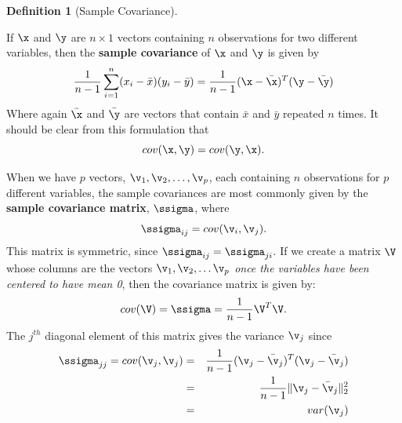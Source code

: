 \documentclass[
]{article}
\theoremstyle{definition}
\newtheorem{definition}{Definition}[section]
\theoremstyle{definition}
\theoremstyle{definition}
\theoremstyle{definition}
\theoremstyle{remark}
\begin{document}
\begin{definition}[Sample Covariance]
\protect\hypertarget{def:covariancedef}{}\label{def:covariancedef}

If \(\x\) and \(\y\) are \(n\times 1\) vectors containing \(n\) observations for two different variables, then the \textbf{sample covariance} of \(\x\) and \(\y\) is given by
\[\frac{1}{n-1}\sum_{i=1}^n (x_i-\bar{x})(y_i-\bar{y}) = \frac{1}{n-1}(\x-\bar{\x})^T(\y-\bar{\y})\]
Where again \(\bar{\x}\) and \(\bar{\y}\) are vectors that contain \(\bar{x}\) and \(\bar{y}\) repeated \(n\) times. It should be clear from this formulation that \[cov(\x,\y)=cov(\y,\x).\]

When we have \(p\) vectors, \(\v_1,\v_2,\dots,\v_p\), each containing \(n\) observations for \(p\) different variables, the sample covariances are most commonly given by the \textbf{sample covariance matrix}, \(\ssigma\), where \[\ssigma_{ij}=cov(\v_i,\v_j).\] This matrix is symmetric, since \(\ssigma_{ij}=\ssigma_{ji}\). If we create a matrix \(\V\) whose columns are the vectors \(\v_1,\v_2,\dots \v_p\) \emph{once the variables have been centered to have mean 0}, then the covariance matrix is given by:
\[cov(\V)=\ssigma = \frac{1}{n-1}\V^T\V.\]
The \(j^{th}\) diagonal element of this matrix gives the variance \(\v_j\) since
\begin{eqnarray}
\ssigma_{jj}=cov(\v_j,\v_j) &=&\frac{1}{n-1}(\v_j-\bar{\v}_j)^T(\v_j-\bar{\v}_j) \\
&=&\frac{1}{n-1}\|\v_j-\bar{\v}_j\|_2^2\\
&=& var(\v_j)
\end{eqnarray}

\end{definition}
\end{document}
